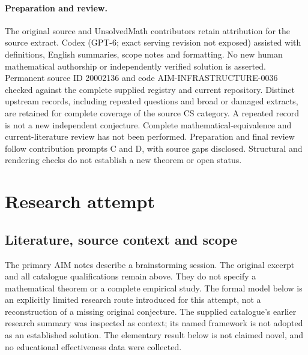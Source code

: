 \documentclass[11pt]{article}
\begin{document}
\paragraph{Preparation and review.}
The original source and UnsolvedMath contributors retain attribution for the source extract. Codex (GPT-6; exact serving revision not exposed) assisted with definitions, English summaries, scope notes and formatting. No new human mathematical authorship or independently verified solution is asserted. Permanent source ID 20002136 and code AIM-INFRASTRUCTURE-0036 checked against the complete supplied registry and current repository. Distinct upstream records, including repeated questions and broad or damaged extracts, are retained for complete coverage of the source CS category. A repeated record is not a new independent conjecture. Complete mathematical-equivalence and current-literature review has not been performed. Preparation and final review follow contribution prompts C and D, with source gaps disclosed. Structural and rendering checks do not establish a new theorem or open status.
\label{end:20002136}

\section{Research attempt}
\subsection{Literature, source context and scope}
The primary AIM notes describe a brainstorming session. The original excerpt and all catalogue qualifications remain above. They do not specify a mathematical theorem or a complete empirical study. The formal model below is an explicitly limited research route introduced for this attempt, not a reconstruction of a missing original conjecture. The supplied catalogue's earlier research summary was inspected as context; its named framework is not adopted as an established solution. The elementary result below is not claimed novel, and no educational effectiveness data were collected.
\end{document}
